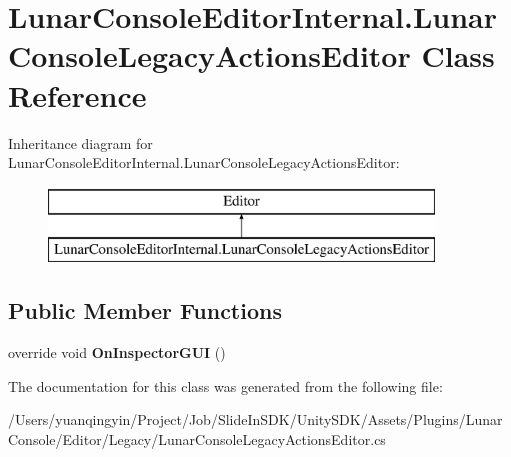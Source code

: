\hypertarget{class_lunar_console_editor_internal_1_1_lunar_console_legacy_actions_editor}{}\section{Lunar\+Console\+Editor\+Internal.\+Lunar\+Console\+Legacy\+Actions\+Editor Class Reference}
\label{class_lunar_console_editor_internal_1_1_lunar_console_legacy_actions_editor}
Inheritance diagram for Lunar\+Console\+Editor\+Internal.\+Lunar\+Console\+Legacy\+Actions\+Editor\+:\begin{figure}[H]
\begin{center}
\leavevmode
\includegraphics[height=2.000000cm]{class_lunar_console_editor_internal_1_1_lunar_console_legacy_actions_editor}
\end{center}
\end{figure}
\subsection*{Public Member Functions}
\begin{DoxyCompactItemize}
\item 
\mbox{\label{class_lunar_console_editor_internal_1_1_lunar_console_legacy_actions_editor_acad85493078a9b005ad96715643b2a89}} 
override void {\bfseries On\+Inspector\+G\+UI} ()
\end{DoxyCompactItemize}


The documentation for this class was generated from the following file\+:\begin{DoxyCompactItemize}
\item 
/\+Users/yuanqingyin/\+Project/\+Job/\+Slide\+In\+S\+D\+K/\+Unity\+S\+D\+K/\+Assets/\+Plugins/\+Lunar\+Console/\+Editor/\+Legacy/Lunar\+Console\+Legacy\+Actions\+Editor.\+cs\end{DoxyCompactItemize}
